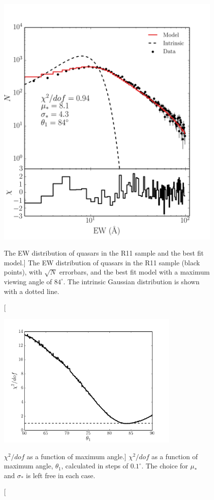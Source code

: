 \begin{figure}
\centering
\includegraphics[width=1.0\textwidth]{figures/ewpaper/log_quasar_fit.png}
\caption
[The EW distribution of quasars in the R11 sample and the best fit model.]
{
The EW distribution of quasars in the R11 sample (black points), 
with $\sqrt{N}$ errorbars, and the best fit model with a maximum 
viewing angle of $84^\circ$. The intrinsic Gaussian distribution
is shown with a dotted line. 
}
\label{fig:chi2}
\end{figure}

\begin{figure}
\centering
\includegraphics[width=0.8\textwidth]{figures/ewpaper/chi2_o3.png}
\caption
[$\chi^2/dof$ as a function of maximum angle.]
{
$\chi^2/dof$ as a function of maximum angle, $\theta_1$, calculated in
steps of $0.1^\circ$. The choice for $\mu_*$ and $\sigma_*$ is 
left free in each case.
}
\label{fig:chi2_curve}
\end{figure}

